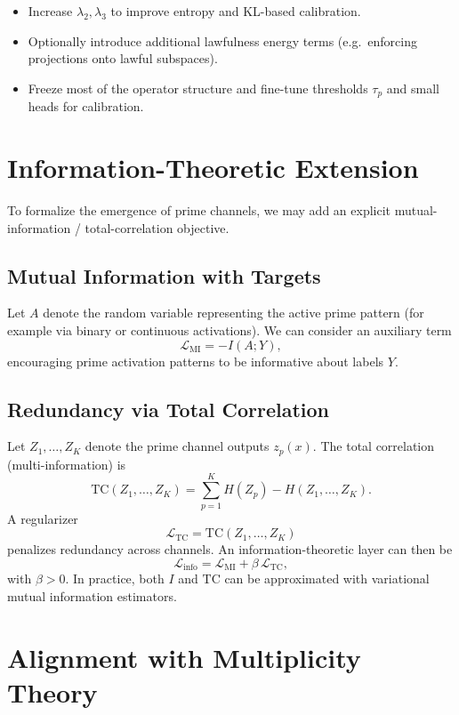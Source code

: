\documentclass[11pt]{article}
\begin{document}
\begin{itemize}[leftmargin=*]
  \item Increase \(\lambda_2, \lambda_3\) to improve entropy and KL-based calibration.
  \item Optionally introduce additional lawfulness energy terms (e.g.\ enforcing projections onto lawful subspaces).
  \item Freeze most of the operator structure and fine-tune thresholds \(\tau_p\) and small heads for calibration.
\end{itemize}

\section{Information-Theoretic Extension}

To formalize the emergence of prime channels, we may add an explicit mutual-information / total-correlation objective.

\subsection{Mutual Information with Targets}

Let \(A\) denote the random variable representing the active prime pattern (for example via binary or continuous activations).
We can consider an auxiliary term
\[
  \mathcal{L}_{\mathrm{MI}} = -I(A; Y),
\]
encouraging prime activation patterns to be informative about labels \(Y\).

\subsection{Redundancy via Total Correlation}

Let \(Z_1, \dots, Z_K\) denote the prime channel outputs \(z_p(x)\).
The total correlation (multi-information) is
\[
  \mathrm{TC}(Z_1,\dots,Z_K) =
    \sum_{p=1}^{K} H(Z_p) - H(Z_1,\dots,Z_K).
\]
A regularizer
\[
  \mathcal{L}_{\mathrm{TC}} = \mathrm{TC}(Z_1,\dots,Z_K)
\]
penalizes redundancy across channels.
An information-theoretic layer can then be
\[
  \mathcal{L}_{\mathrm{info}} = \mathcal{L}_{\mathrm{MI}} + \beta\,\mathcal{L}_{\mathrm{TC}},
\]
with \(\beta > 0\).
In practice, both \(I\) and \(\mathrm{TC}\) can be approximated with variational mutual information estimators.

\section{Alignment with Multiplicity Theory}
\end{document}
